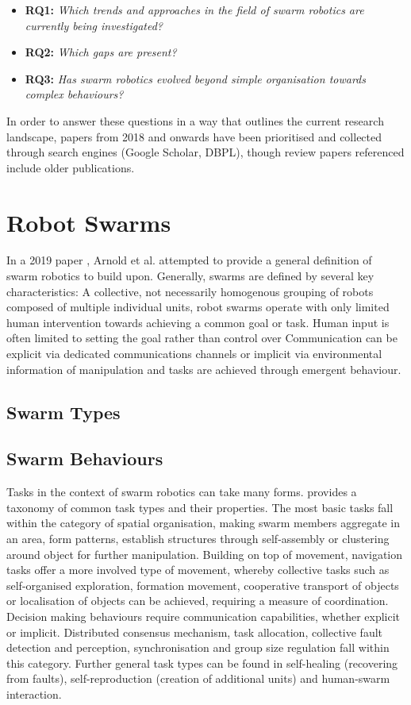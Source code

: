 \documentclass{article}
\begin{document}
\begin{itemize}
	\item \textbf{RQ1:} \textit{Which trends and approaches in the field of swarm robotics are currently being investigated?}
	\item \textbf{RQ2:} \textit{Which gaps are present?}
	\item \textbf{RQ3:} \textit{Has swarm robotics evolved beyond simple organisation towards complex behaviours?}
\end{itemize}

In order to answer these questions in a way that outlines the current research landscape, papers from 2018 and onwards have been prioritised and collected through search engines (Google Scholar, DBPL), though review papers referenced include older publications.

\section{Robot Swarms}
In a 2019 paper \cite{arnold2019swarmRoboticsGeneralDef}, Arnold et al. attempted to provide a general definition of swarm robotics to build upon. Generally, swarms are defined by several key characteristics: A collective, not necessarily homogenous grouping of robots composed of multiple individual units, robot swarms operate with only limited human intervention towards achieving a common goal or task. Human input is often limited to setting the goal rather than control over Communication can be explicit via dedicated communications channels or implicit via environmental information of manipulation and tasks are achieved through emergent behaviour.

\subsection{Swarm Types}
\subsection{Swarm Behaviours}
Tasks in the context of swarm robotics can take many forms. \cite{schranz2020swarmBehaviourDef} provides a taxonomy of common task types and their properties. The most basic tasks fall within the category of spatial organisation, making swarm members aggregate in an area, form patterns, establish structures through self-assembly or clustering around object for further manipulation. \newline
Building on top of movement, navigation tasks offer a more involved type of movement, whereby collective tasks such as self-organised exploration, formation movement, cooperative transport of objects or localisation of objects can be achieved, requiring a measure of coordination. \newline
Decision making behaviours require communication capabilities, whether explicit or implicit. Distributed consensus mechanism, task allocation, collective fault detection and perception, synchronisation and group size regulation fall within this category. \newline
Further general task types can be found in self-healing (recovering from faults), self-reproduction (creation of additional units) and human-swarm interaction.
\end{document}
